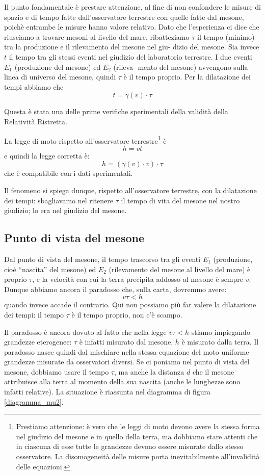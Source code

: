 Il punto fondamentale è prestare attenzione, al fine di non confondere le
misure di spazio e di tempo fatte dall'osservatore terrestre con quelle fatte dal
mesone, poichè entrambe le misure hanno valore relativo. Dato che l'esperienza 
ci dice che riusciamo a trovare mesoni al livello del mare, ribatteziamo
$\tau$ il tempo (minimo) tra la produzione e il rilevamento del mesone nel giu-
dizio del mesone. Sia invece $t$ il tempo tra gli stessi eventi nel giudizio del
laboratorio terrestre. I due eventi $E_1$ (produzione del mesone) ed $E_2$ (rileva-
mento del mesone) avvengono sulla linea di universo del mesone, quindi $\tau$ è
il tempo proprio. Per la dilatazione dei tempi abbiamo che
\[ t = \gamma (v) \cdot \tau\]

Questa è stata una delle prime verifiche sperimentali della validità della Relatività
Ristretta.

La legge di moto rispetto all'osservatore terrestre\footnote{Prestiamo attenzione: 
è vero che le leggi di moto devono avere la stessa forma nel
giudizio del mesone e in quello della terra, ma dobbiamo stare attenti che in ciascuna di 
esse tutte le grandezze devono essere misurate dallo stesso osservatore. La disomogeneità
delle misure porta inevitabilmente all'invalidità delle equazioni.}
è
\[ h = vt \]
e quindi la legge corretta è:
\[ h = (\gamma (v) \cdot v) \cdot \tau \]
che è compatibile con i dati sperimentali.

Il fenomeno si spiega dunque, rispetto all'osservatore terrestre, con la
dilatazione dei tempi: sbagliavamo nel ritenere $\tau$ il tempo di vita del mesone
nel nostro giudizio; lo era nel giudizio del mesone.

\subsection{Punto di vista del mesone}
Dal punto di vista del mesone, il tempo trascorso tra gli eventi $E_1$ (produzione, 
cioè ``nascita'' del mesone) ed $E_2$ (rilevamento del mesone al livello del
mare) è proprio $\tau$, e la velocità con cui la terra precipita addosso al mesone è
sempre $v$. Dunque abbiamo ancora il paradosso che, sulla carta, dovremmo
avere:
\[ v\tau < h \]
quando invece accade il contrario. Qui non possiamo più far valere la dilatazione 
dei tempi: il tempo $\tau$ è il tempo proprio, non c'è scampo.

Il paradosso è ancora dovuto al fatto che nella legge $v\tau < h$ stiamo impiegando 
grandezze eterogenee: $\tau$ è infatti misurato dal mesone, $h$ è misurato
dalla terra. Il paradosso nasce quindi dal mischiare nella stessa equazione
del moto uniforme grandezze misurate da osservatori diversi. Se ci poniamo nel punto di vista
del mesone, dobbiamo usare il tempo $\tau$, ma anche la distanza $d$ che il
mesone attribuisce alla terra al momento della sua nascita (anche le lunghezze
sono infatti relative). La situazione è riassunta nel diagramma di figura \ref{diagramma_mu2}.

